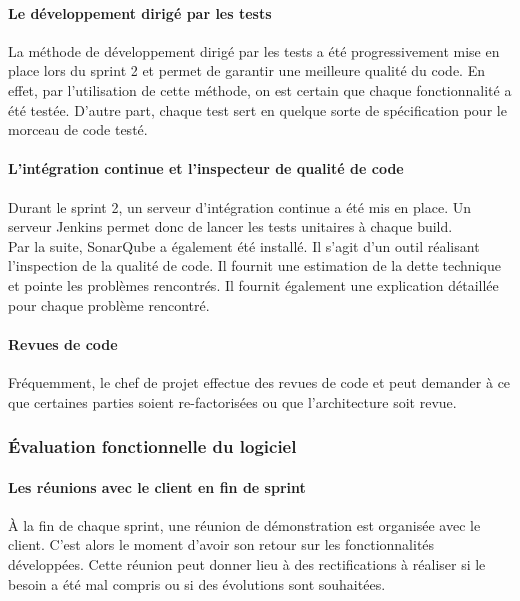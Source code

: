 \paragraph*{Le développement dirigé par les tests\\}
La méthode de développement dirigé par les tests a été progressivement mise en place lors du sprint 2 et permet de garantir une meilleure qualité du code. En effet, par l'utilisation de cette méthode, on est certain que chaque fonctionnalité a été testée. D'autre part, chaque test sert en quelque sorte de spécification pour le morceau de code testé.

\paragraph*{L'intégration continue et l'inspecteur de qualité de code\\} 
Durant le sprint 2, un serveur d'intégration continue a été mis en place. Un serveur Jenkins permet donc de lancer les tests unitaires à chaque build. \\
Par la suite, SonarQube a également été installé. Il s'agit d'un outil réalisant l'inspection de la qualité de code. Il fournit une estimation de la dette technique et pointe les problèmes rencontrés. Il fournit également une explication détaillée pour chaque problème rencontré.

\paragraph{Revues de code\\}
Fréquemment, le chef de projet effectue des revues de code et peut demander à ce que certaines parties soient re-factorisées ou que l'architecture soit revue.

\subsubsection{Évaluation fonctionnelle du logiciel}
\paragraph*{Les réunions avec le client en fin de sprint\\}
À la fin de chaque sprint, une réunion de démonstration est organisée avec le client. C'est alors le moment d'avoir son retour sur les fonctionnalités développées. Cette réunion peut donner lieu à des rectifications à réaliser si le besoin a été mal compris ou si des évolutions sont souhaitées. \\

